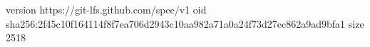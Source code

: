 version https://git-lfs.github.com/spec/v1
oid sha256:2f45c10f164114f8f7ea706d2943c10aa982a71a0a24f73d27ec862a9ad9bfa1
size 2518
